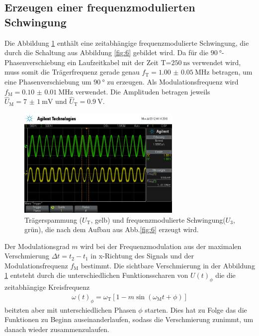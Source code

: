 \FloatBarrier
\subsection{Erzeugen einer frequenzmodulierten Schwingung}
\label{subsec:auswertung_d}
Die Abbildung \ref{fig:freq_zeit} enthält eine zeitabhängige frequenzmodulierte
Schwingung, die durch die Schaltung aus Abbildung \ref{fig:6}
gebildet wird.
Da für die  $\SI{90}{\degree}$-Phasenverschiebung ein Laufzeitkabel mit der
Zeit T=$\SI{250}{\nano\second}$ verwendet wird, muss somit die
Trägerfrequenz gerade genau $f_{\text{T}} = \SI{1.00(5)}{\mega\hertz}$
betragen, um eine Phasenverschiebung um $\SI{90}{\degree}$
zu erzeugen. Als Modulationsfrequenz wird
$f_{\text{M}}=\SI{0.10(1)}{\mega\hertz}$ verwendet.
Die Amplituden betragen jeweils
$\hat{U}_{\text{M}}=\SI{7(1)}{\milli\volt}$
und
$\hat{U}_{\text{T}}=\SI{0.9}{\volt}$.
\begin{figure}
  \centering
  \includegraphics[width=0.7\textwidth]{osci/freq_mod.png}
  \caption{Trägerspammung ($U_{\text{T}}$, gelb) und frequenzmodulierte
  Schwingung($U_3$, grün), die nach dem Aufbau aus Abb.\ref{fig:6} erzeugt wird.}
  \label{fig:freq_zeit}
\end{figure}
Der Modulationsgrad $m$ wird
bei der Frequenzmodulation
aus der maximalen Verschmierung
$\Delta t=t_2-t_1$ in x-Richtung des Signals
und der Modulationsfrequenz $f_{\text{M}}$ bestimmt.
Die sichtbare Verschmierung in der
Abbildung \ref{fig:freq_zeit}
entsteht durch die unterschiedlichen
Funktionsscharen von $U(t)_{\phi}$ die
die zeitabhängige Kreisfrequenz
\begin{align}
\omega(t)_{\phi}=\omega_\text{T}\left[1-m\sin(\omega_\text{M}t + \phi)\right]
\end{align}
beitzten aber mit unterschiedlichen Phasen $\phi$ starten.
Dies hat zu Folge das die Funktionen zu Beginn
auseinanderlaufen, sodass die Verschmierung
zunimmt, um danach wieder
zusammenzulaufen.
